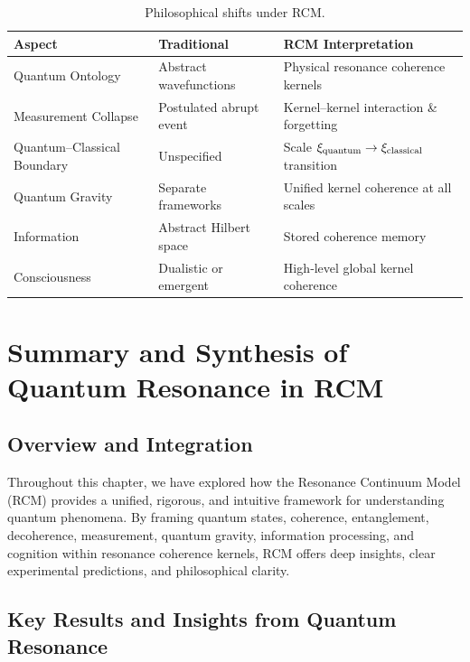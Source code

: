 \begin{table}[H]
  \centering
  \begin{tabular}{p{} p{} p{}}
    \toprule
    \textbf{Aspect}             & \textbf{Traditional}               & \textbf{RCM Interpretation}                  \\
    \midrule
    Quantum Ontology            & Abstract wavefunctions            & Physical resonance coherence kernels         \\
    Measurement Collapse        & Postulated abrupt event           & Kernel–kernel interaction \& forgetting      \\
    Quantum–Classical Boundary  & Unspecified                       & Scale $\xi_{\rm quantum}\to\xi_{\rm classical}$ transition \\
    Quantum Gravity             & Separate frameworks               & Unified kernel coherence at all scales       \\
    Information                 & Abstract Hilbert space            & Stored coherence memory                     \\
    Consciousness               & Dualistic or emergent             & High‐level global kernel coherence           \\
    \bottomrule
  \end{tabular}
  \caption{Philosophical shifts under RCM.}
\end{table}

\section{Summary and Synthesis of Quantum Resonance in RCM}

\subsection{Overview and Integration}

Throughout this chapter, we have explored how the Resonance Continuum Model (RCM) provides a unified, rigorous, and intuitive framework for understanding quantum phenomena. By framing quantum states, coherence, entanglement, decoherence, measurement, quantum gravity, information processing, and cognition within resonance coherence kernels, RCM offers deep insights, clear experimental predictions, and philosophical clarity.

\subsection{Key Results and Insights from Quantum Resonance}

